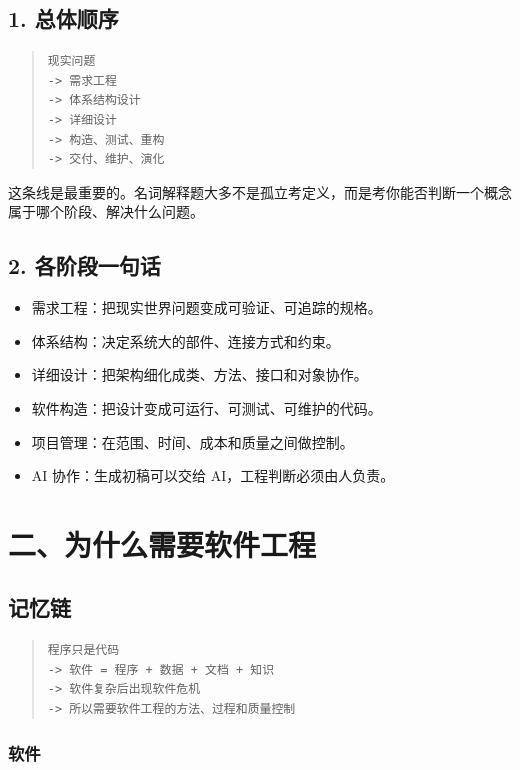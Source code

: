 \documentclass[UTF8,zihao=-4]{ctexart}
\begin{document}
\subsection{1. 总体顺序}


\begin{quote}
\footnotesize
\begin{verbatim}
现实问题
-> 需求工程
-> 体系结构设计
-> 详细设计
-> 构造、测试、重构
-> 交付、维护、演化
\end{verbatim}
\end{quote}


这条线是最重要的。名词解释题大多不是孤立考定义，而是考你能否判断一个概念属于哪个阶段、解决什么问题。


\subsection{2. 各阶段一句话}


\begin{itemize}
\item 需求工程：把现实世界问题变成可验证、可追踪的规格。
\item 体系结构：决定系统大的部件、连接方式和约束。
\item 详细设计：把架构细化成类、方法、接口和对象协作。
\item 软件构造：把设计变成可运行、可测试、可维护的代码。
\item 项目管理：在范围、时间、成本和质量之间做控制。
\item AI 协作：生成初稿可以交给 AI，工程判断必须由人负责。
\end{itemize}

\section{二、为什么需要软件工程}


\subsection{记忆链}


\begin{quote}
\footnotesize
\begin{verbatim}
程序只是代码
-> 软件 = 程序 + 数据 + 文档 + 知识
-> 软件复杂后出现软件危机
-> 所以需要软件工程的方法、过程和质量控制
\end{verbatim}
\end{quote}


\subsubsection*{软件}
\end{document}

